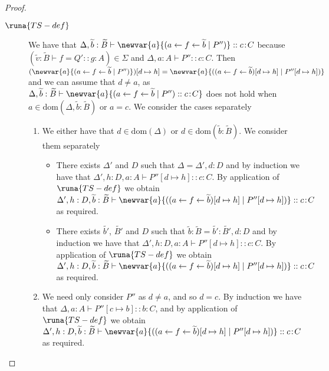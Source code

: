 \begin{lemma}
\begin{proof}
\begin{description}
\item[$\runa{TS-def}$] We have that $\Delta,\widetilde{b}:\widetilde{B}\vdash \newvar{a}{(a \leftarrow f \leftarrow \widetilde{b} \mid P'')} :: c\!:\!C$ because $(\widetilde{v}:\widetilde{B}\vdash f = Q' :: g\!:\!A)\in\Sigma$ and $\Delta,a:A\vdash P'' :: c\!:\!C$. Then $(\newvar{a}{(a\leftarrow f \leftarrow\widetilde{b} \mid P'')})[d\mapsto h]=\newvar{a}{((a\leftarrow f \leftarrow\widetilde{b})[d\mapsto h] \mid P''[d\mapsto h])}$ and we can assume that $d\neq a$, as $\Delta,\widetilde{b}:\widetilde{B}\vdash \newvar{a}{(a\leftarrow f \leftarrow\widetilde{b} \mid P'') :: c\!:\!C}$ does not hold when $a\in \text{dom}(\Delta,\widetilde{b}:\widetilde{B})$ or $a=c$. We consider the cases separately
\begin{enumerate}
    \item We either have that $d\in\text{dom}(\Delta)$ or $d\in\text{dom}(\widetilde{b}:\widetilde{B})$. We consider them separately
    \begin{itemize}
        \item There exists $\Delta'$ and $D$ such that $\Delta=\Delta',d:D$ and by induction we have that $\Delta',h:D,a:A\vdash P''[d\mapsto h] :: c\!:C$. By application of $\runa{TS-def}$ we obtain $\Delta',h:D,\widetilde{b}:\widetilde{B}\vdash \newvar{a}{((a\leftarrow f \leftarrow\widetilde{b})[d\mapsto h] \mid P''[d\mapsto h])} :: c\!:\!C$ as required.
        
        \item There exists $\widetilde{b'}$, $\widetilde{B'}$ and $D$ such that $\widetilde{b}:\widetilde{B}=\widetilde{b'}:\widetilde{B'},d:D$ and by induction we have that $\Delta',h:D,a:A\vdash P''[d\mapsto h] :: c\!:C$. By application of $\runa{TS-def}$ we obtain $\Delta',h:D,\widetilde{b}:\widetilde{B}\vdash \newvar{a}{((a\leftarrow f \leftarrow\widetilde{b})[d\mapsto h] \mid P''[d\mapsto h])} :: c\!:\!C$ as required.
    \end{itemize}
    
    \item We need only consider $P''$ as $d\neq a$, and so $d=c$. By induction we have that $\Delta,a:A\vdash P''[c\mapsto b] :: b\!:\!C$, and by application of $\runa{TS-def}$ we obtain $\Delta',h:D,\widetilde{b}:\widetilde{B}\vdash \newvar{a}{((a\leftarrow f \leftarrow\widetilde{b})[d\mapsto h] \mid P''[d\mapsto h])} :: c\!:\!C$ as required.
\end{enumerate}

    

\end{description}
\end{proof}
\end{lemma}
